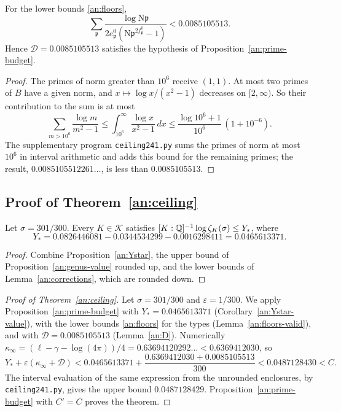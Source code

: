 \begin{lemma}\label{an:D}
For the lower bounds \eqref{an:floors},
\begin{equation}\label{an:R}
 \sum_{\mathfrak p}\frac{\log\mathrm N\mathfrak p}
 {2e^0_{\mathfrak p}(\mathrm N\mathfrak p^{2f^0_{\mathfrak p}}-1)}
 <0.0085105513.
\end{equation}
Hence $\mathcal D=0.0085105513$ satisfies the hypothesis of
Proposition~\ref{an:prime-budget}.
\end{lemma}

\begin{proof}
The primes of norm greater than $10^6$ receive $(1,1)$. At most two primes of
$B$ have a given norm, and $x\mapsto\log x/(x^2-1)$ decreases on
$[2,\infty)$. So their contribution to the sum is at most
\[
 \sum_{m>10^6}\frac{\log m}{m^2-1}\le\int_{10^6}^\infty\frac{\log x}{x^2-1}\,dx
 \le\frac{\log10^6+1}{10^6}\,(1+10^{-6}).
\]
The supplementary program \texttt{ceiling241.py} sums the primes of norm at
most $10^6$ in interval arithmetic and adds this bound for the remaining
primes; the result, $0.0085105512261\ldots$, is less than $0.0085105513$.
\end{proof}

\subsection{\texorpdfstring{Proof of Theorem~\ref{an:ceiling}}{Proof of the Upper Bound}}

\begin{corollary}\label{an:Ystar-value}
Let $\sigma=301/300$. Every $K\in\mathcal K$ satisfies
$[K:\mathbb Q]^{-1}\log\zeta_K(\sigma)\le Y_*$, where
\[
 Y_*=0.0826446081-0.0344534299-0.0016298411=0.0465613371.
\]
\end{corollary}

\begin{proof}
Combine Proposition~\ref{an:Ystar}, the upper bound of
Proposition~\ref{an:genus-value} rounded up, and the lower bounds of
Lemma~\ref{an:corrections}, which are rounded down.
\end{proof}

\begin{proof}[Proof of Theorem~\ref{an:ceiling}]
Let $\sigma=301/300$ and $\varepsilon=1/300$. We apply
Proposition~\ref{an:prime-budget} with $Y_*=0.0465613371$
(Corollary~\ref{an:Ystar-value}), with the lower bounds \eqref{an:floors}
for the types (Lemma~\ref{an:floors-valid}), and with
$\mathcal D=0.0085105513$ (Lemma~\ref{an:D}). Numerically
$\kappa_\infty=(\ell-\gamma-\log(4\pi))/4=0.63694120292\ldots<0.6369412030$,
so
\[
 Y_*+\varepsilon(\kappa_\infty+\mathcal D)
 <0.0465613371+\frac{0.6369412030+0.0085105513}{300}
 <0.0487128430<C.
\]
The interval evaluation of the same expression from the unrounded
enclosures, by \texttt{ceiling241.py}, gives the upper bound
$0.0487128429$. Proposition~\ref{an:prime-budget} with $C'=C$ proves
the theorem.
\end{proof}

